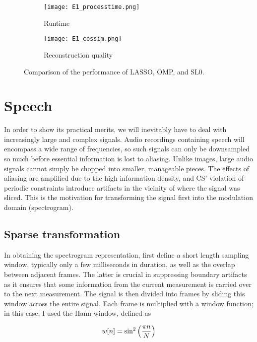 \begin{figure}[htb]
	\centering
	\begin{subfigure}{0.49\textwidth}
		\centering
		\texttt{[image: E1\_processtime.png]}
		\caption{Runtime}
		\label{fig:guitar-runtime}
	\end{subfigure}
	\begin{subfigure}{0.49\textwidth}
		\centering
		\texttt{[image: E1\_cossim.png]}
		\caption{Reconstruction quality}
		\label{fig:guitar-cossim}
	\end{subfigure}
	\caption{Comparison of the performance of LASSO, OMP, and SL0.}
	\label{fig:guitar-algorithms}
\end{figure}


\section{Speech}
\label{sec:audio-speech}
In order to show its practical merits, we will inevitably have to deal with increasingly large and complex signals. Audio recordings containing speech will encompass a wide range of frequencies, so such signals can only be downsampled so much before essential information is lost to aliasing. Unlike images, large audio signals cannot simply be chopped into smaller, manageable pieces. The effects of aliasing are amplified due to the high information density, and CS' violation of periodic constraints introduce artifacts in the vicinity of where the signal was sliced. This is the motivation for transforming the signal first into the modulation domain (spectrogram).

\subsection{Sparse transformation}
\label{ssec:audio-speech-sparse}
In obtaining the spectrogram representation, first define a short length sampling window, typically only a few milliseconds in duration, as well as the overlap between adjacent frames. The latter is crucial in suppressing boundary artifacts as it ensures that some information from the current measurement is carried over to the next measurement. The signal is then divided into frames by sliding this window across the entire signal. Each frame is multiplied with a window function; in this case, I used the Hann window, defined as

\begin{equation}
	\label{eq:hann-window}
	w[n] = \sin^2\qty(\frac{\pi n}{N})
\end{equation}

